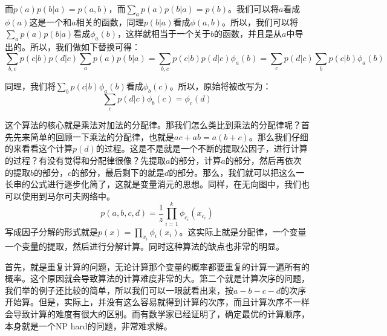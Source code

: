\documentclass[a4paper]{article}
\begin{document}
而$p(a)p(b|a) = p(a,b)$，而$\sum_a p(a)p(b|a) = p(b)$。我们可以将$a$看成$\phi(a)$这是一个和$a$相关的函数，同理$p(b|a)$看成$\phi(a,b)$。所以，我们可以将$\sum_a p(a)p(b|a)$看成$\phi_a(b)$，这样就相当于一个关于$b$的函数，并且是从$a$中导出的。所以，我们做如下替换可得：
\begin{equation}
    \sum_{b,c}p(c|b)p(d|c)\sum_a p(a)p(b|a) = \sum_{b,c}p(c|b)p(d|c)\phi_a(b)=\sum_c p(d|c)\sum_b p(c|b)\phi_a(b)
\end{equation}

同理，我们将$\sum_b p(c|b)\phi_a(b)$看成$\phi_b(c)$。所以，原始将被改写为：
\begin{equation}
    \sum_cp(d|c)\phi_b(c) = \phi_c(d)
\end{equation}

这个算法的核心就是乘法对加法的分配律。那我们怎么类比到乘法的分配律呢？首先先来简单的回顾一下乘法的分配律，也就是$ac+ab=a(b+c)$。那么我们仔细的来看看这个计算$p(d)$的过程。这是不是就是一个不断的提取公因子，进行计算的过程？有没有觉得和分配律很像？先提取$a$的部分，计算$a$的部分，然后再依次的提取$b$的部分，$c$的部分，最后剩下的就是$d$的部分。那么，我们就可以把这么一长串的公式进行逐步化简了，这就是变量消元的思想。同样，在无向图中，我们也可以使用到马尔可夫网络中。
\begin{equation}
    p(a,b,c,d) = \frac{1}{z}\prod_{i=1}^k \phi_{c_i}(x_{c_i})
\end{equation}
写成因子分解的形式就是$p(x) = \prod_{x_i}\phi_i(x_i)$。这实际上就是分配律，一个变量一个变量的提取，然后进行分解计算。同时这种算法的缺点也非常的明显。

首先，就是重复计算的问题，无论计算那个变量的概率都要重复的计算一遍所有的概率。这个原因就会导致算法的计算难度非常的大。第二个就是计算次序的问题，我们举的例子还比较的简单，所以我们可以一眼就看出来，按$a-b-c-d$的次序开始算。但是，实际上，并没有这么容易就得到计算的次序，而且计算次序不一样会导致计算的难度有很大的区别。而有数学家已经证明了，确定最优的计算顺序，本身就是一个NP hard的问题，非常难求解。
\end{document}
